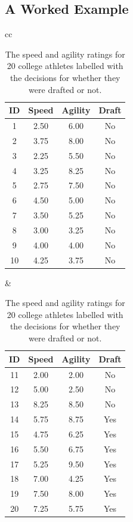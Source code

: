 \documentclass[xcolor={table}]{beamer}
\begin{document}
\subsection{A Worked Example}

\begin{frame} 
\begin{table}[htb]
\caption{The speed and agility ratings for 20 college athletes labelled with the decisions for whether they were drafted or not. }
\label{table:draftProspects}
\begin{footnotesize}
\centering
\begin{tabular}{cc}
		\hline
			\begin{minipage}{0.45\textwidth}
\centering
					\begin{tabular}[ht]{cccc} 
\textbf{ID}	 & \textbf{Speed} & \textbf{Agility} & \textbf{Draft}\\
\hline
1 & 2.50 & 6.00 & No\\
2 & 3.75 & 8.00 & No\\
3 & 2.25 & 5.50 & No\\
4 & 3.25 & 8.25 & No\\
5 & 2.75 & 7.50 & No\\
6 & 4.50 & 5.00 & No\\
7 & 3.50 & 5.25 & No\\
8 & 3.00 & 3.25 & No\\
9 & 4.00 & 4.00 & No\\
10 & 4.25 & 3.75 & No\\
\hline
					\end{tabular}
			\end{minipage}
			&
			\begin{minipage}{0.45\textwidth}
\centering
					\begin{tabular}[ht]{cccc} 
\textbf{ID}	 & \textbf{Speed} & \textbf{Agility} & \textbf{Draft}\\
\hline
11 & 2.00 & 2.00 & No\\
12 & 5.00 & 2.50 & No\\
13 & 8.25 & 8.50 & No\\
14 & 5.75 & 8.75 & Yes\\
15 & 4.75 & 6.25 & Yes\\
16 & 5.50 & 6.75 & Yes\\
17 & 5.25 & 9.50 & Yes\\
18 & 7.00 & 4.25 & Yes\\
19 & 7.50 & 8.00 & Yes\\
20 & 7.25 & 5.75 & Yes\\
\hline
				\end{tabular}
			\end{minipage}\\
\end{tabular}
\end{footnotesize}
\end{table}
\end{frame} 
\end{document}
